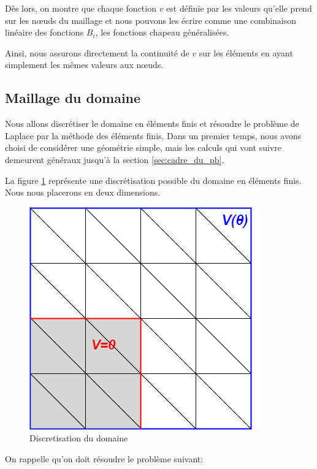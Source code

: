 \documentclass{article}
\begin{document}
Dès lors, on montre que chaque fonction $v$
est définie par les valeurs qu'elle prend
sur les nœuds du maillage et nous pouvons les écrire comme une combinaison
linéaire des fonctions $B_i$, les fonctions chapeau généralisées.

Ainsi, nous assurons directement la continuité de $v$ sur les éléments en
ayant simplement les mêmes valeurs aux nœuds.

\newpage

\subsection{Maillage du domaine}
\label{sec:maillage}

\hspace{0.5cm}
Nous allons discrétiser le domaine en éléments finis et résoudre le problème
de Laplace par la méthode des éléments finis. Dans un premier temps,
nous avons choisi de considérer une géométrie simple, mais les calculs
qui vont suivre demeurent généraux jusqu'à la section \ref{sec:cadre_du_pb}.

La figure \ref{fig:pointe_ef} représente une discrétisation possible
du domaine en éléments finis.
Nous nous placerons en deux dimensions.

\begin{figure}[h]
    \centering
    \hspace{1cm} \includegraphics[scale= 0.7]{img/pointe_ef.png}
    \caption{Discretisation du domaine}
    \label{fig:pointe_ef}
\end{figure}

On rappelle qu'on doit résoudre le problème suivant:
\end{document}
